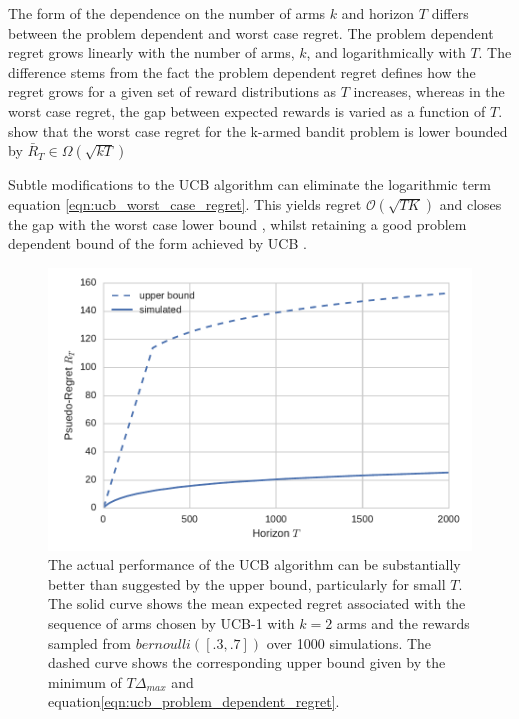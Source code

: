 \documentclass[11pt,a4paper,oneside]{book}
\newcommand{\bigo}[1]{\mathcal{O}\left( #1 \right)}
\newcommand{\bigomega}[1]{\Omega\left( #1 \right)}
\newcommand{\regret}{\bar{R}_{T}} %
\theoremstyle{plain}
\theoremstyle{definition}
\begin{document}
The form of the dependence on the number of arms $k$ and horizon $T$ differs between the problem dependent and worst case regret. The problem dependent regret grows linearly with the number of arms, $k$, and logarithmically with $T$. The difference stems from the fact the problem dependent regret defines how the regret grows for a given set of reward distributions as $T$ increases, whereas in the worst case regret, the gap between expected rewards is varied as a function of $T$. \citet{Auer1995} show that the worst case regret for the k-armed bandit problem is lower bounded by $\regret \in \bigomega{\sqrt{kT}}$

Subtle modifications to the UCB algorithm can eliminate the logarithmic term equation \ref{eqn:ucb_worst_case_regret}. This yields regret $ \bigo{\sqrt{TK}}$ and closes the gap with the worst case lower bound \citep{Audibert2009,Lattimore2015}, whilst retaining a good problem dependent bound of the form achieved by UCB \citep{Lattimore2015}.

\begin{figure}
\includegraphics[scale=1]{upper_bound_vs_actual_average_regret}
\caption{The actual performance of the UCB algorithm can be substantially better than suggested by the upper bound, particularly for small $T$. The solid curve shows the mean expected regret associated with the sequence of arms chosen by UCB-1 with $k=2$ arms and the rewards sampled from $bernoulli([.3,.7])$ over 1000 simulations. The dashed curve shows the corresponding upper bound given by the minimum of $T\Delta_{max}$ and equation\ref{eqn:ucb_problem_dependent_regret}.}
\label{fig:ucb_upperbound_vs_actual_performance}
\end{figure}
\end{document}
